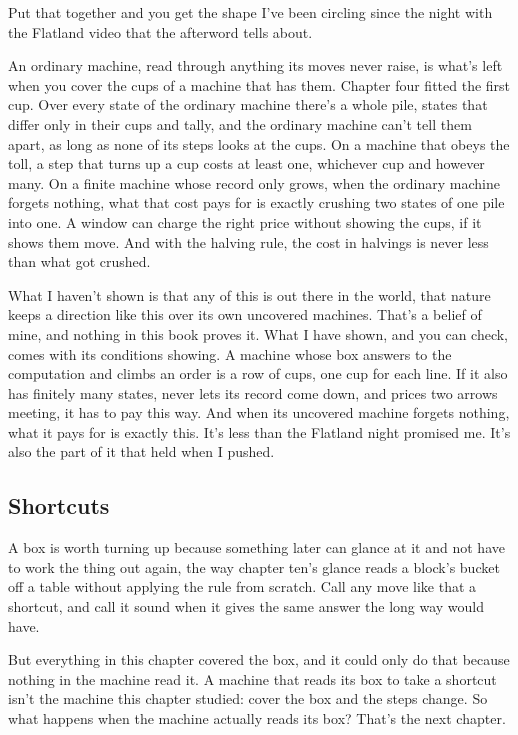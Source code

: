 \documentclass[11pt,twoside]{article}
\theoremstyle{thielethm}
\theoremstyle{thieledef}
\theoremstyle{thieledef}
\theoremstyle{thieledef}
\theoremstyle{thielethm}
\theoremstyle{thieleobs}
\theoremstyle{thielethm}
\begin{document}
Put that together and you get the shape I've been circling since the night with the Flatland video that the afterword tells about.

An ordinary machine, read through anything its moves never raise, is what's left when you cover the cups of a machine that has them. Chapter four fitted the first cup. Over every state of the ordinary machine there's a whole pile, states that differ only in their cups and tally, and the ordinary machine can't tell them apart, as long as none of its steps looks at the cups. On a machine that obeys the toll, a step that turns up a cup costs at least one, whichever cup and however many. On a finite machine whose record only grows, when the ordinary machine forgets nothing, what that cost pays for is exactly crushing two states of one pile into one. A window can charge the right price without showing the cups, if it shows them move. And with the halving rule, the cost in halvings is never less than what got crushed.

What I haven't shown is that any of this is out there in the world, that nature keeps a direction like this over its own uncovered machines. That's a belief of mine, and nothing in this book proves it. What I have shown, and you can check, comes with its conditions showing. A machine whose box answers to the computation and climbs an order is a row of cups, one cup for each line. If it also has finitely many states, never lets its record come down, and prices two arrows meeting, it has to pay this way. And when its uncovered machine forgets nothing, what it pays for is exactly this. It's less than the Flatland night promised me. It's also the part of it that held when I pushed.

\subsection{Shortcuts}

A box is worth turning up because something later can glance at it and not have to work the thing out again, the way chapter ten's glance reads a block's bucket off a table without applying the rule from scratch. Call any move like that a shortcut, and call it sound when it gives the same answer the long way would have.

But everything in this chapter covered the box, and it could only do that because nothing in the machine read it. A machine that reads its box to take a shortcut isn't the machine this chapter studied: cover the box and the steps change. So what happens when the machine actually reads its box? That's the next chapter.
\end{document}
